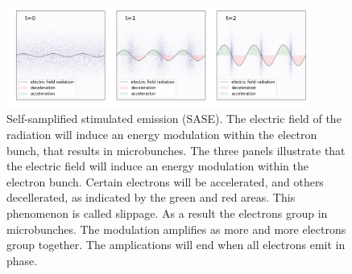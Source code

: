 \begin{figure}[h]
\centering
\includegraphics[width=100mm]{Chapter_03_GenerationXrayXFEL_microbunching.png}
\caption{Self-samplified stimulated emission (SASE). The electric field of the radiation will induce an energy modulation within the electron bunch, that results in microbunches. The three panels illustrate that the electric field will induce an energy modulation within the electron bunch. Certain electrons will be accelerated, and others decellerated, as indicated by the green and red areas. This phenomenon is called slippage. As a result the electrons group in microbunches. The modulation amplifies as more and more electrons group together. The amplications will end when all electrons emit in phase.  }\label{fig:microbunching}
\end{figure}